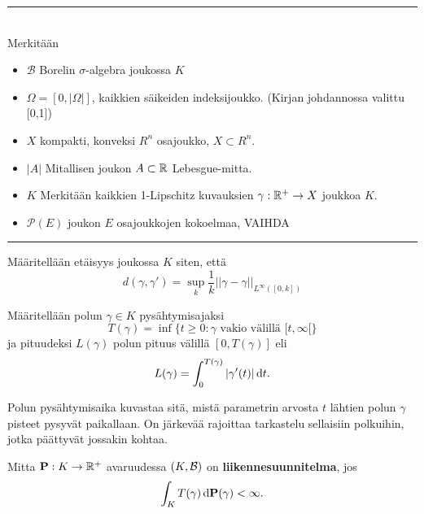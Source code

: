 

\hrule $\color{white}{.}$ \\
Merkitään 
\begin{itemize}
    \item $\mathcal{B}$ Borelin $\sigma$-algebra joukossa $K$
    \item $\Omega = [0,|\Omega|]$, kaikkien säikeiden indeksijoukko. (Kirjan johdannossa valittu [0,1])
    \item $X$ kompakti, konveksi $R^n$ osajoukko, $X \subset R^n$.
    \item $|A|$ Mitallisen joukon $A\subset \mathbb{R}$ Lebesgue-mitta.
    \item $K$ Merkitään kaikkien 1-Lipschitz kuvauksien $\gamma:\mathbb{R}^+ \to X$ joukkoa $K$. 
    \item $\mathcal{P}(E)$ joukon $E$ osajoukkojen kokoelmaa, VAIHDA
\end{itemize}
\hrule


\begin{definition}
    Määritellään etäisyys joukossa $K$ siten, että
    \[d(\gamma, \gamma') = \sup_k \frac{1}{k}||\gamma - \gamma||_{L^\infty([0,k])}\]
\end{definition}

\begin{definition}
    Määritellään polun $\gamma \in K$ pysähtymisajaksi 
    \begin{equation*}
        T(\gamma) = \inf\{t\ge0:\gamma \text{ vakio välillä } [t,\infty[ \}
    \end{equation*}
    ja pituudeksi $L(\gamma)$ polun pituus välillä $[0, T(\gamma)]$ eli
     \begin{equation*}
         L(\gamma) = \int_0^{T(\gamma)}|\gamma'(t)|\, \text{d}t.
     \end{equation*}
\end{definition}

Polun pysähtymisaika kuvastaa sitä, mistä parametrin arvosta $t$ lähtien polun $\gamma$ pisteet pysyvät paikallaan. On järkevää rajoittaa tarkastelu sellaisiin polkuihin, jotka päättyvät jossakin kohtaa.

\begin{definition}\label{def:liikennesuunnitelma}
    Mitta $\mathbf{P}: K \to \mathbb{R}^+$ avaruudessa  $(K, \mathcal{B})$ on \textbf{liikennesuunnitelma}, jos
    \begin{equation*}
     \int_K T(\gamma) \, \text{d} \mathbf{P} (\gamma) < \infty.   
    \end{equation*}
\end{definition}

